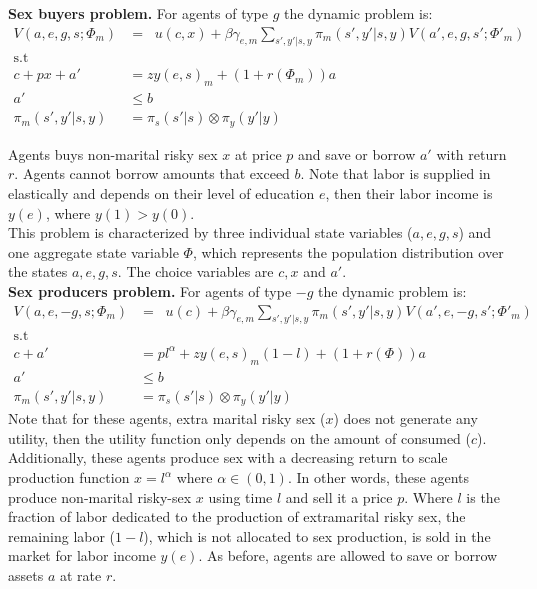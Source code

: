 \noindent \textbf{Sex buyers problem.} For agents of type $g$ the dynamic problem is:
\begin{align}
V(a,e,g,s;\Phi_m) &= \mathop{\max_{c\geq 0,x \geq 0,a' \geq 0}}  u(c,x) + \beta \gamma_{e,m} \sum_{s',y'|s,y}\pi_m(s',y'|s,y)  V(a',e,g,s';\Phi'_m) \label{eq1}\\
\mbox{s.t}\nonumber\\
c+ px +a'&= zy(e,s)_m + (1+r(\Phi_m))a \label{eq2}\\
a' &\leq b \\
\pi_m(s',y'|s,y) & = \pi_{s}(s'|s) \otimes\pi_{y}(y'|y)
\end{align}



 Agents buys non-marital risky sex $x$ at price $p$ and save or borrow $a'$ with return $r$. Agents cannot borrow amounts that exceed $b$. Note that labor is supplied in elastically and depends on their level of education $e$, then their labor income is $y(e)$, where $y(1)>y(0)$.\\
 This problem is characterized by three individual state variables ($a,e,g,s$) and one aggregate state variable $\Phi$, which represents the population distribution over the states $a,e,g,s$. The choice variables are $c,x$ and $a'$.\\


\noindent \textbf{Sex producers problem.} For agents of type $-g$ the dynamic problem is:
\begin{align}
V(a,e,-g,s;\Phi_m) &= \mathop{\max_{c\geq 0, 1\geq l\geq 0,a' \geq 0}}  u(c) + \beta \gamma_{e,m}  \sum_{s',y'|s,y}\pi_m(s',y'|s,y) V(a',e,-g,s';\Phi'_m) \label{eq3}\\
\mbox{s.t}\nonumber\\
c +a'&= pl^{\alpha}+zy(e,s)_m(1-l) + (1+r(\Phi))a \label{eq4}\\
a' &\leq b \\
\pi_m(s',y'|s,y) & = \pi_{s}(s'|s) \otimes\pi_{y}(y'|y)
\end{align}
Note that for these agents, extra marital risky sex ($x$) does not generate any utility, then the utility function only depends on the amount of consumed ($c$). Additionally, these agents produce sex with a decreasing return to scale production function $x=l^{\alpha}$ where $\alpha\in(0,1)$. In other words, these agents produce non-marital risky-sex $x$ using time $l$ and sell it a price $p$. Where $l$ is the fraction of labor dedicated to the production of extramarital risky sex, the remaining labor ($1-l$), which is not allocated to sex production, is sold in the market for labor income $y(e)$. As before, agents are allowed to save or borrow assets $a$ at rate $r$.\\



